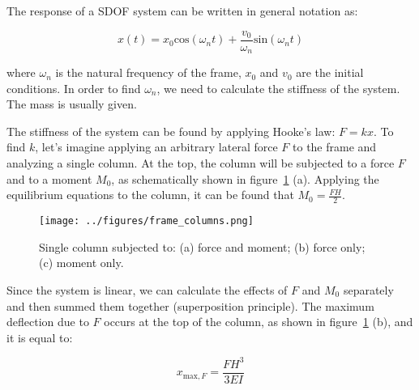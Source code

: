 \documentclass[12pt,letter]{article}
\begin{document}
%



The response of a SDOF system can be written in general notation as:

\begin{equation}
x(t) = x_0\text{cos}(\omega_n t) + \frac{v_0}{\omega_n}\text{sin}(\omega_n t)
\end{equation}

where $\omega_n$ is the natural frequency of the frame, $x_0$ and $v_0$ are the initial conditions. In order to find $\omega_n$, we need to calculate the stiffness of the system. The mass is usually given. 

The stiffness of the system can be found by applying Hooke's law: $F = k x$. To find $k$, let's imagine applying an arbitrary lateral force $F$ to the frame and analyzing a single column. At the top, the column will be subjected to a force $F$ and to a moment $M_0$, as schematically shown in figure~\ref{fig:columns_draw} (a). Applying the equilibrium equations to the column, it can be found that $M_0 = \frac{F H}{2}$. 

\begin{figure}[H]
	\centering
	\texttt{[image: ../figures/frame\_columns.png]}
	\caption{Single column subjected to: (a) force and moment; (b) force only; (c) moment only.}
	\label{fig:columns_draw}
\end{figure}


Since the system is linear, we can calculate the effects of $F$ and $M_0$ separately and then summed them together (superposition principle). The maximum deflection due to $F$ occurs at the top of the column, as shown in figure~\ref{fig:columns_draw} (b), and it is equal to:

\begin{equation} \label{Eq_xmax_F}
x_{\text{max},F} = \frac{FH^3}{3EI}
\end{equation}
\end{document}

